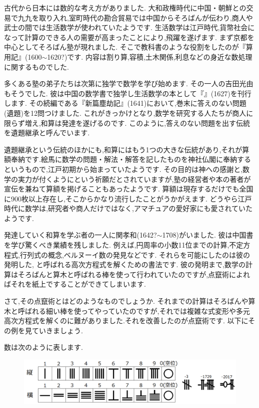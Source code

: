 \documentclass[./main]{subfiles}
\begin{document}


古代から日本には数的な考え方がありました. 大和政権時代に中国・朝鮮との交易で九九を取り入れ,室町時代の勘合貿易では中国からそろばんが伝わり,商人や武士の間では生活数学が使われていたようです. 生活数学は江戸時代,貨幣社会になって計算のできる人の需要が高まったことにより,飛躍を遂げます. まず京都を中心としてそろばん塾が現れました. そこで教科書のような役割をしたのが『算用記』(1600$\sim$1620?)です. 内容は割り算,容積,土木関係,利息などの身近な数処理に関するものでした.

多くある塾の弟子たちは次第に独学で数学を学び始めます. その一人の吉田光由もそうでした. 彼は中国の数学書で独学し生活数学の本として『』(1627)を刊行します. その続編である『新篇塵劫記』(1641)において,巻末に答えのない問題(遺題)を12問つけました. これがきっかけとなり,数学を研究する人たちが商人に限らず増え,和算は発達を遂げるのです. このように,答えのない問題を出す伝統を遺題継承と呼んでいます.

遺題継承という伝統のほかにも,和算にはもう1つの大きな伝統があり,それが算額奉納です.絵馬に数学の問題・解法・解答を記したものを神社仏閣に奉納するというもので,江戸初期から始まっていたようです. その目的は神への感謝と,数学の実力が付くようにという祈願だとされていますが,塾の経営者や本の著者が宣伝を兼ねて算額を掲げることもあったようです. 算額は現存するだけでも全国に900枚以上存在し,そこからかなり流行したことがうかがえます. どうやら江戸時代に数学は,研究者や商人だけではなく,アマチュアの愛好家にも愛されていたようです.

発達していく和算を学ぶ者の一人に関孝和(1642?$\sim$1708)がいました. 彼は中国書を学び驚くべき業績を残しました. 例えば,円周率の小数11位までの計算,不定方程式,行列式の概念,ベルヌーイ数の発見などです. それらを可能にしたのは彼の発明した, と呼ばれる高次方程式を解くための書法です. 彼の発明まで,数学の計算はそろばんと算木と呼ばれる棒を使って行われていたのですが,点竄術によればそれを紙上ですることができてしまいます.



さて,その点竄術とはどのようなものでしょうか. それまでの計算はそろばんや算木と呼ばれる細い棒を使ってやっていたのですが,それでは複雑な式変形や多元高次方程式を解くのに難がありました.それを改善したのが点竄術です. 以下にその例を見ていきましょう.

数は次のように表します.

\begin{figure}[H]
\begin{center}
\includegraphics[width=18cm,bb=0 0 1222 258]{ookuwa0.png}
\end{center}
\end{figure}
\end{document}
